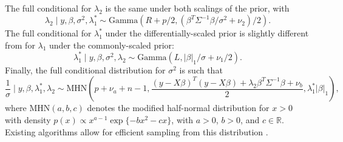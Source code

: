 \documentclass[12pt]{article}
\begin{document}
The full conditional for $\lambda_2$ is the same under both scalings of the prior, with
\[
	\lambda_2 \mid y, \beta, \sigma^2, \lambda_1^* \sim
		\mbox{Gamma}\left( R + p/2, (\beta^T \Sigma^{-1} \beta/\sigma^2 + \nu_2)/2 \right).
\]
The full conditional for $\lambda_1^*$ under the differentially-scaled prior is slightly different from
for $\lambda_1$ under the commonly-scaled prior:
\[
	\lambda_1^* \mid y, \beta, \sigma^2, \lambda_2 \sim
		\mbox{Gamma}\left( L , |\beta|_1/\sigma + \nu_1/2 \right).
\]
Finally, the full conditional distribution for $\sigma^2$ is such that
\[
	\frac{1}{\sigma} \mid y, \beta, \lambda_1^*, \lambda_2 \sim
		\mbox{MHN}\left( p + \nu_a + n - 1, 
			\frac{(y - X\beta)^T(y - X\beta) + \lambda_2 \beta^T \Sigma^{-1}\beta + \nu_b}{2},
			\lambda_1^* |\beta|_1 \right),
\]
where $\mbox{MHN}(a,b,c)$ denotes the modified half-normal distribution for $x > 0$ with density 
$p(x) \propto x^{a-1} \exp\{-b x^2 - cx\}$, with $a > 0$, $b > 0$, and 
$c \in \mathbb{R}$. Existing algorithms allow for efficient sampling from this distribution
\citep[see, e.g., the rejection sampling methods of][]{sun:20, sun:23}. 





\end{document}
